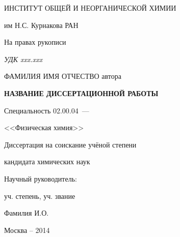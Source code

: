 \thispagestyle{empty}

\begin{center}
	ИНСТИТУТ ОБЩЕЙ И НЕОРГАНИЧЕСКОЙ ХИМИИ\par
	им Н.С. Курнакова РАН\par 
	\par
\end{center}

\vspace{20mm}
\begin{flushright}
	На правах рукописи
	
	{\sl УДК xxx.xxx}
\end{flushright}

\vspace{30mm}
\begin{center}
	{\large ФАМИЛИЯ ИМЯ ОТЧЕСТВО автора}
\end{center}

\vspace{5mm}
\begin{center}
	{\bf \large НАЗВАНИЕ ДИССЕРТАЦИОННОЙ РАБОТЫ
		\par}
	
	\vspace{10mm}
	{%
		Специальность 02.00.04~---
		
		<<Физическая химия>>
	}
	
	\vspace{10mm}
	Диссертация на соискание учёной степени
	
	кандидата химических наук
\end{center}

\vspace{20mm}
\begin{flushright}
	Научный руководитель:
	
	уч. степень, уч. звание
	
	Фамилия И.О.
	
\end{flushright}

\vspace{20mm}
\begin{center}
	{Москва -- 2014}
\end{center}

\newpage